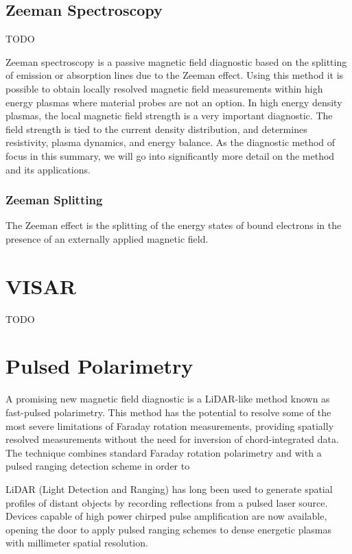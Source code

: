 \documentclass{jpp}
\begin{document}
\citep{MageeRM2012Atpa}

\subsection{Zeeman Spectroscopy}

{\Large TODO \par}

Zeeman spectroscopy is a passive magnetic field diagnostic based on the splitting of emission or absorption lines due to the Zeeman effect. Using this method it is possible to obtain locally resolved magnetic field measurements within high energy plasmas where material probes are not an option. In high energy density plasmas, the local magnetic field strength is a very important diagnostic. The field strength is tied to the current density distribution, and determines resistivity, plasma dynamics, and energy balance. As the diagnostic method of focus in this summary, we will go into significantly more detail on the method and its applications.

\subsubsection{Zeeman Splitting}

The Zeeman effect is the splitting of the energy states of bound electrons in the presence of an externally applied magnetic field. 

\section{VISAR}
{\Large TODO \par}
\citep{doi:10.1063/1.1660986}

\section{Pulsed Polarimetry}

A promising new magnetic field diagnostic is a LiDAR-like method known as fast-pulsed polarimetry. This method has the potential to resolve some of the most severe limitations of Faraday rotation measurements, providing spatially resolved measurements without the need for inversion of chord-integrated data. The technique combines standard Faraday rotation polarimetry \citep{Pisarczyk1990} and  with a pulsed ranging detection scheme in order to 

LiDAR (Light Detection and Ranging) has long been used to generate spatial profiles of distant objects by recording reflections from a pulsed laser source. Devices capable of high power chirped pulse amplification \citep{STRICKLAND1985219} are now available, opening the door to apply pulsed ranging schemes to dense energetic plasmas with millimeter spatial resolution.
\end{document}
